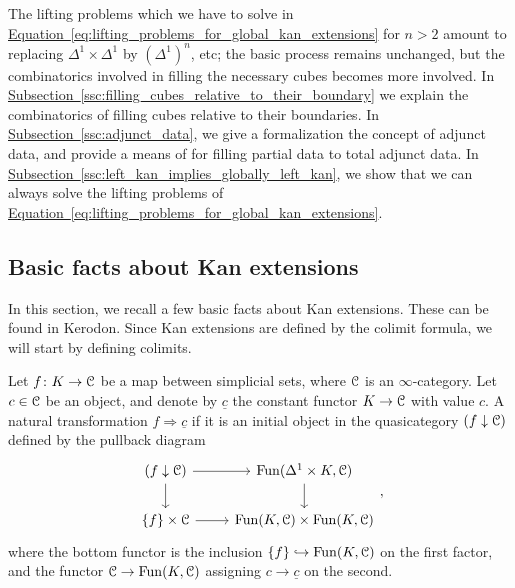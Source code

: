 \documentclass[main.tex]{subfiles}
\begin{document}
The lifting problems which we have to solve in \hyperref[eq:lifting_problems_for_global_kan_extensions]{Equation~\ref*{eq:lifting_problems_for_global_kan_extensions}} for $n > 2$ amount to replacing $\Delta^{1} \times \Delta^{1}$ by $(\Delta^{1})^{n}$, etc; the basic process remains unchanged, but the combinatorics involved in filling the necessary cubes becomes more involved. In \hyperref[ssc:filling_cubes_relative_to_their_boundary]{Subsection~\ref*{ssc:filling_cubes_relative_to_their_boundary}} we explain the combinatorics of filling cubes relative to their boundaries. In \hyperref[ssc:adjunct_data]{Subsection~\ref*{ssc:adjunct_data}}, we give a formalization the concept of adjunct data, and provide a means of for filling partial data to total adjunct data. In \hyperref[ssc:left_kan_implies_globally_left_kan]{Subsection~\ref*{ssc:left_kan_implies_globally_left_kan}}, we show that we can always solve the lifting problems of \hyperref[eq:lifting_problems_for_global_kan_extensions]{Equation~\ref*{eq:lifting_problems_for_global_kan_extensions}}.

\subsection{Basic facts about Kan extensions}
\label{ssc:basic_facts_about_kan_extensions}

In this section, we recall a few basic facts about Kan extensions. These can be found in Kerodon. Since Kan extensions are defined by the colimit formula, we will start by defining colimits.

\begin{definition}
  Let $f\colon K \to \mathcal{C}$ be a map between simplicial sets, where $\mathcal{C}$ is an $\infty$-category. Let $c \in \mathcal{C}$ be an object, and denote by $\underline{c}$ the constant functor $K \to \mathcal{C}$ with value $c$. A natural transformation $f \Rightarrow \underline{c}$  if it is an initial object in the quasicategory $(f \downarrow \mathcal{C})$ defined by the pullback diagram
  \begin{equation*}
    \begin{tikzcd}
      (f \downarrow \category{C})
      \arrow[r]
      \arrow[d]
      & \Fun(\Delta^{1} \times K, \category{C})
      \arrow[d]
      \\
      \{f\} \times \category{C}
      \arrow[r]
      & \Fun(K, \category{C}) \times \Fun(K, \category{C})
    \end{tikzcd},
  \end{equation*}
  where the bottom functor is the inclusion $\{f\} \hookrightarrow \mathrm{Fun}(K, \mathcal{C})$ on the first factor, and the functor $\mathcal{C} \to \mathrm{Fun}(K, \mathcal{C})$ assigning $c \to \underline{c}$ on the second.
\end{definition}
\end{document}
